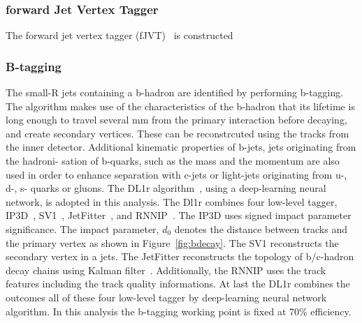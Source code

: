 \subsubsection{forward Jet Vertex Tagger}
The forward jet vertex tagger (fJVT)~\cite{PERF-2016-06} is constructed 
\subsubsection{B-tagging}
The small-R jets containing a b-hadron are identified by performing b-tagging.
The algorithm makes use of the characteristics of the b-hadron that its lifetime is long enough to travel several mm from the primary interaction before decaying, and create secondary vertices. These can be reconstrcuted using the tracks from the inner detector.
Additional kinematic properties of b-jets, jets originating from the hadroni- sation of b-quarks, such as the mass and the momentum are also used in order to enhance separation with c-jets or light-jets originating from u-, d-, s- quarks or gluons.
The DL1r algorithm~\cite{ATL-PHYS-PUB-2020-009}, using a deep-learning neural network, is adopted in this analysis.
The Dl1r combines four low-level tagger, IP3D~\cite{ATL-PHYS-PUB-2017-013}, SV1~\cite{ATL-PHYS-PUB-2017-011}, JetFitter~\cite{ATL-PHYS-PUB-2018-025}, and RNNIP~\cite{ATL-PHYS-PUB-2017-003}.
The IP3D uses signed impact parameter significance. The impact parameter, $d_0$ denotes the distance between tracks and the primary vertex as shown in Figure~\ref{fig:bdecay}.
The SV1 reconstructs the secondary vertex in a jets. The JetFitter reconstructs the topology of b/c-hadron decay chains using Kalman filter~\cite{FRUHWIRTH1987444}.
Additionally, the RNNIP uses the track features including the track quality informations.
At last the DL1r combines the outcomes all of these four low-level tagger by deep-learning neural network algorithm.
In this analysis the b-tagging working point is fixed at 70\% efficiency.
